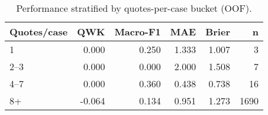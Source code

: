 \begin{table}
\caption{Performance stratified by quotes-per-case bucket (OOF).}
\label{tab:robustness-qpc}
\begin{tabular}{lrrrrr}
\toprule
Quotes/case & QWK & Macro-F1 & MAE & Brier & n \\
\midrule
1 & 0.000 & 0.250 & 1.333 & 1.007 & 3 \\
2–3 & 0.000 & 0.000 & 2.000 & 1.508 & 7 \\
4–7 & 0.000 & 0.360 & 0.438 & 0.738 & 16 \\
8+ & -0.064 & 0.134 & 0.951 & 1.273 & 1690 \\
\bottomrule
\end{tabular}
\end{table}
